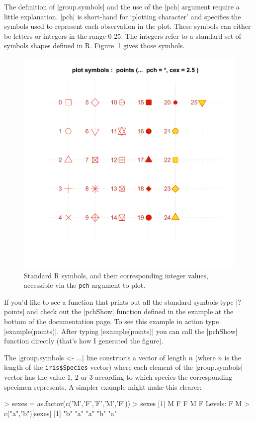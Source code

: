 
The definition of |group.symbols| and the use of the |pch| argument require a little explanation. |pch| is short-hand for `plotting  character' and specifies the symbols used to represent each observation in the plot.  These symbols can either be letters or integers in the range 0-25. The integers refer to a standard set of symbols shapes defined in R. Figure~1 gives those symbols.

\begin{figure}
\begin{center}

\includegraphics[width=0.5\columnwidth]{pch-symbols}

\end{center}
\caption{Standard R symbols, and their corresponding integer values, accessible via the \texttt{pch} argument to plot.}
\end{figure}

If you'd like to see a function that prints out all the standard symbols type |?points| and check out the |pchShow| function defined in the example at the bottom of the documentation page.  To see this example in action type |example(points)|. After typing |example(points)| you can call the |pchShow| function directly (that's how I generated the figure).

The |group.symbols <- ...| line constructs a vector of length $n$ (where $n$ is the length of the \lstinline|iris$Species| vector) where each element of the |group.symbols| vector has the value 1, 2 or 3 according to which species the corresponding specimen represents.  A simpler example might make this clearer:
\begin{R}
> sexes = as.factor(c('M','F','F','M','F'))
> sexes
[1] M F F M F
Levels: F M
> c("a","b")[sexes]
[1] "b" "a" "a" "b" "a"
\end{R}

